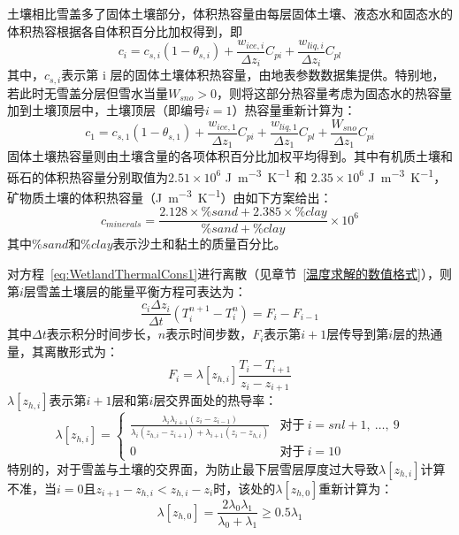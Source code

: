土壤相比雪盖多了固体土壤部分，体积热容量由每层固体土壤、液态水和固态水的体积热容根据各自体积百分比加权得到，即
\begin{equation}
c_{i}=c_{s, i}\left(1-\theta_{s, i}\right)+\frac{w_{ice, i}}{\Delta z_{i}} C_{pi}+\frac{w_{liq, i}}{\Delta z_{i}} C_{p l}
\end{equation}
其中，$c_{s,i}$表示第 i 层的固体土壤体积热容量，由地表参数数据集提供。特别地，若此时无雪盖分层但雪水当量$W_{sno}>0$，则将这部分热容量考虑为固态水的热容量加到土壤顶层中，土壤顶层（即编号$i=1$）热容量重新计算为：
\begin{equation}
c_{1}=c_{s,1}\left(1-\theta_{s, 1}\right)+\frac{w_{ice, 1}}{\Delta z_{1}} C_{pi}+\frac{w_{liq,1}}{\Delta z_{1}} C_{pl}+\frac{W_{sno}}{\Delta z_{1}} C_{pi}
\end{equation}
固体土壤热容量则由土壤含量的各项体积百分比加权平均得到。其中有机质土壤和砾石的体积热容量分别取值为$2.51 \times 10^{6}$ \unit{J.m^{−3}.K^{−1}} 和 $2.35 \times 10^{6}$ \unit{J.m^{−3}.K^{−1}}，矿物质土壤的体积热容量（\unit{J.m^{−3}.K^{−1}}）由如下方案给出：
\begin{equation}
c_{minerals}=\frac{2.128\times\%sand+2.385\times\%clay}{\%sand+\%clay}\times10^6
\end{equation}
其中$\%sand$和$\%clay$表示沙土和黏土的质量百分比。

对方程~\eqref{eq:WetlandThermalCons1}进行离散（见章节~\ref{温度求解的数值格式}），则第$i$层雪盖土壤层的能量平衡方程可表达为：
\begin{equation}\label{eq:WetlandThermal1}
    \frac{c_i \Delta z_i}{\Delta t} \left(T^{n+1}_i - T^n_i\right) = F_i - F_{i-1}
\end{equation}
其中$\Delta t$表示积分时间步长，$n$表示时间步数，$F_i$表示第$i+1$层传导到第$i$层的热通量，其离散形式为：
\begin{equation}
    F_i = \lambda \left[z_{h,i}\right] \frac{T_i-T_{i+1}}{z_i-z_{i+1}}
\end{equation}
$\lambda\left[z_{h,i}\right]$表示第$i+1$层和第$i$层交界面处的热导率：
\begin{equation}
    \lambda \left[z_{h,i}\right] = \begin{cases}
        \frac{\lambda_i\lambda_{i+1}\left(z_i-z_{i-1}\right)}{\lambda_i\left(z_{h,i}-z_{i+1}\right)+\lambda_{i+1}\left(z_i-z_{h,i}\right)}  &\text{对于}\ i=snl+1,\ \ldots,\ 9 \\
        0 &\text{对于}\ i=10
    \end{cases}
\end{equation}
特别的，对于雪盖与土壤的交界面，为防止最下层雪层厚度过大导致$\lambda\left[z_{h,i}\right]$计算不准，当$i=0$且$z_{i+1}-z_{h,i}<z_{h,i}-z_i$时，该处的$\lambda\left[z_{h,0}\right]$重新计算为：
\begin{equation}
    \lambda\left[z_{h,0}\right]=\frac{2\lambda_0\lambda_1}{\lambda_0+\lambda_1} \geqslant 0.5\lambda_1
\end{equation}

